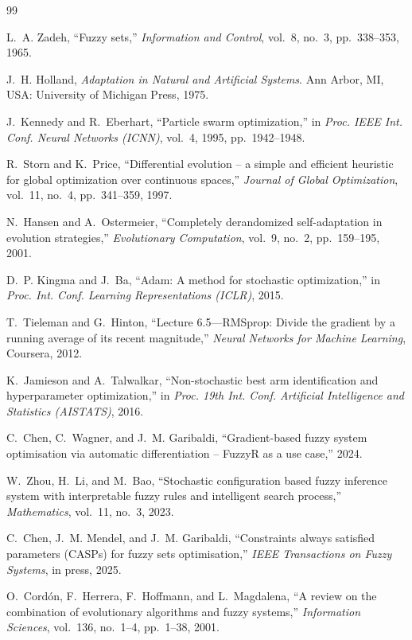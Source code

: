 \documentclass[conference]{IEEEtran}
\begin{document}
\begin{thebibliography}{99}

L.~A. Zadeh, ``Fuzzy sets,'' \emph{Information and Control}, vol.~8, no.~3,
pp.~338--353, 1965.

J.~H. Holland, \emph{Adaptation in Natural and Artificial Systems}.
Ann Arbor, MI, USA: University of Michigan Press, 1975.

J.~Kennedy and R.~Eberhart, ``Particle swarm optimization,'' in
\emph{Proc. IEEE Int. Conf. Neural Networks (ICNN)}, vol.~4, 1995,
pp.~1942--1948.

R.~Storn and K.~Price, ``Differential evolution -- a simple and efficient
heuristic for global optimization over continuous spaces,''
\emph{Journal of Global Optimization}, vol.~11, no.~4, pp.~341--359, 1997.

N.~Hansen and A.~Ostermeier, ``Completely derandomized self-adaptation in
evolution strategies,'' \emph{Evolutionary Computation}, vol.~9, no.~2,
pp.~159--195, 2001.

D.~P. Kingma and J.~Ba, ``Adam: A method for stochastic optimization,'' in
\emph{Proc. Int. Conf. Learning Representations (ICLR)}, 2015.

T.~Tieleman and G.~Hinton, ``Lecture 6.5---RMSprop: Divide the gradient by a
running average of its recent magnitude,'' \emph{Neural Networks for Machine
Learning}, Coursera, 2012.

K.~Jamieson and A.~Talwalkar, ``Non-stochastic best arm identification and
hyperparameter optimization,'' in
\emph{Proc. 19th Int. Conf. Artificial Intelligence and Statistics (AISTATS)},
2016.

C.~Chen, C.~Wagner, and J.~M. Garibaldi,
``Gradient-based fuzzy system optimisation via automatic differentiation --
FuzzyR as a use case,'' 2024.

W.~Zhou, H.~Li, and M.~Bao,
``Stochastic configuration based fuzzy inference system with interpretable fuzzy
rules and intelligent search process,''
\emph{Mathematics}, vol.~11, no.~3, 2023.

C.~Chen, J.~M. Mendel, and J.~M. Garibaldi,
``Constraints always satisfied parameters (CASPs) for fuzzy sets optimisation,''
\emph{IEEE Transactions on Fuzzy Systems}, in press, 2025.

O.~Cordón, F.~Herrera, F.~Hoffmann, and L.~Magdalena,
``A review on the combination of evolutionary algorithms and fuzzy systems,''
\emph{Information Sciences}, vol.~136, no.~1--4, pp.~1--38, 2001.


\end{thebibliography}
\end{document}
